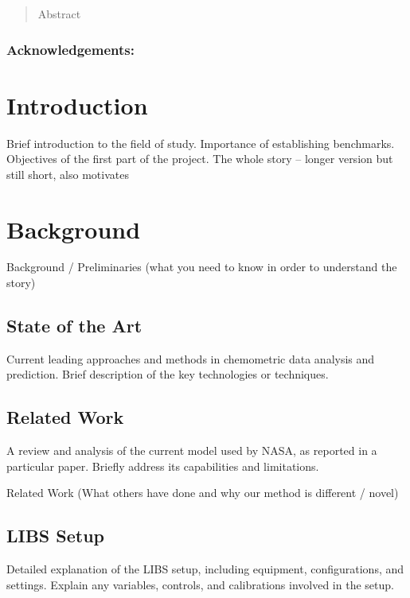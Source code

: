 
\newpage

\begin{abstract}
Abstract
\end{abstract}

\maketitle

\subsubsection*{Acknowledgements:} 


\section{Introduction}
Brief introduction to the field of study.
Importance of establishing benchmarks.
Objectives of the first part of the project.
The whole story – longer version but still short, also motivates

\section{Background}
Background / Preliminaries (what you need to know in order to understand the story)
\subsection{State of the Art}
Current leading approaches and methods in chemometric data analysis and prediction.
Brief description of the key technologies or techniques.

\subsection{Related Work}
A review and analysis of the current model used by NASA, as reported in a particular paper.
Briefly address its capabilities and limitations.

Related Work (What others have done and why our method is different / novel)

\subsection{LIBS Setup}
Detailed explanation of the LIBS setup, including equipment, configurations, and settings.
Explain any variables, controls, and calibrations involved in the setup.

